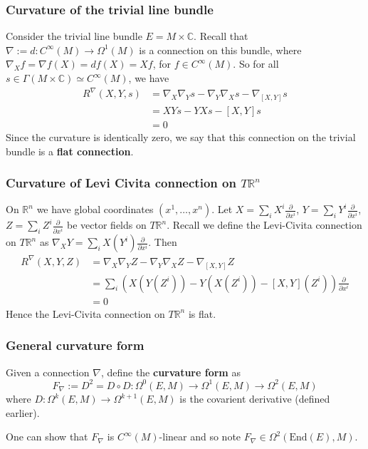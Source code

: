 \documentclass[a4paper]{article}
\theoremstyle{definition} \newtheorem*{definition}{Definition}
\theoremstyle{definition} \newtheorem*{definitions}{Definitions}
\theoremstyle{plain} \newtheorem{theorem}{Theorem}[section]
\theoremstyle{plain} \newtheorem{proposition}[theorem]{Proposition}
\theoremstyle{plain} \newtheorem{corollary}[theorem]{Corollary}
\theoremstyle{plain} \newtheorem{lemma}[theorem]{Lemma}
\theoremstyle{plain} \newtheorem{example}[theorem]{Example}
\newcommand{\defn}[1]{\textbf{#1}}
\newcommand{\realnos}{\mathbb{R}}
\newcommand{\complexnos}{\mathbb{C}}
\newcommand{\End}{\text{End}}
\newcommand{\smooth}{C^\infty}
\begin{document}
\subsubsection{Curvature of the trivial line bundle}
Consider the trivial line bundle $E=M\times \complexnos$. Recall that $\nabla:=d:\smooth(M)\to \Omega^1(M)$ is a connection on this bundle, where $\nabla_X f = \nabla f(X) = df(X) = Xf$, for $f\in \smooth(M)$. 
So for all $s\in \Gamma(M\times \complexnos)\simeq \smooth(M)$, we have
\begin{align*}
    R^\nabla(X, Y, s) & = \nabla_X \nabla_Y s - \nabla_Y \nabla_X s - \nabla_{[X, Y]}s \\
    & = XYs - YXs - [X, Y]s \\
    & = 0
\end{align*}
Since the curvature is identically zero, we say that this connection on the trivial bundle is a \defn{flat connection}.

\subsubsection{Curvature of Levi Civita connection on $T\realnos^n$}
On $\realnos^n$ we have global coordinates $(x^1, \ldots, x^n)$. 
Let
$X=\sum_i X^i \frac{\partial}{\partial x^i}$, $Y=\sum_i Y^i \frac{\partial}{\partial x^i}$, $Z=\sum_i Z^i \frac{\partial}{\partial x^i}$ be vector fields on $T\realnos^n$. 
Recall we define the Levi-Civita connection on $T\realnos^n$ as
$\nabla_X Y = \sum_i X(Y^i) \frac{\partial}{\partial x^i}$. Then 
\begin{align*}
      R^\nabla(X, Y, Z) & = \nabla_X \nabla_Y Z - \nabla_Y \nabla_X Z - \nabla_{[X, Y]} Z \\
      & = \sum_i (X(Y(Z^i))-Y(X(Z^i))-[X, Y](Z^i))\frac{\partial}{\partial x^i} \\
      & = 0
\end{align*}
Hence the Levi-Civita connection on $T\realnos^n$ is flat. 

\subsubsection{General curvature form}
Given a connection $\nabla$, define the \defn{curvature form} as
$$F_\nabla := D^2 = D\circ D: \Omega^0(E, M)\to \Omega^1(E, M) \to \Omega^2(E, M)$$
where $D:\Omega^k(E, M)\to \Omega^{k+1}(E, M)$ is the covarient derivative (defined earlier). 

One can show that $F_\nabla$ is $\smooth(M)$-linear and so note $F_\nabla \in \Omega^2(\End(E), M)$. 
\end{document}
